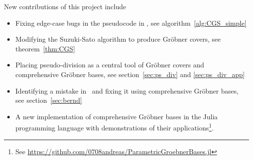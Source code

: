 New contributions of this project include
\begin{itemize}
  \item Fixing edge-case bugs in the pseudocode in \cite{ss_algo}, see algorithm~\ref{alg:CGS_simple}
  \item Modifying the Suzuki-Sato algorithm to produce Gröbner covers, see theorem~\ref{thm:CGS}
  \item Placing pseudo-division as a central tool of Gröbner covers and comprehensive Gröbner bases, see section~\ref{sec:ps_div} and \ref{sec:ps_div_app}
  \item Identifying a mistake in~\cite{sturmfels} and fixing it using comprehensive Gröbner bases, see section~\ref{sec:bernd}
  \item A new implementation of comprehensive Gröbner bases in the Julia programming language with demonstrations of their applications\footnote{See \url{https://github.com/0708andreas/ParametricGroebnerBases.jl}}.
\end{itemize}

